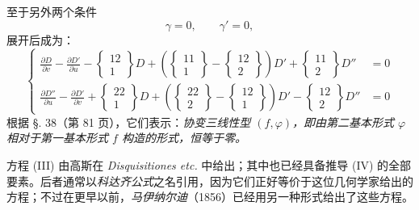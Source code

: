 至于另外两个条件
\[
 \gamma=0,\qquad \gamma'=0,
\]
展开后成为：
\begin{equation}\tag{IV}
\left\{
\begin{aligned}
\frac{\partial D}{\partial v}-\frac{\partial D'}{\partial u}
-\left\{\begin{matrix}12\\1\end{matrix}\right\}D
+\left(
\left\{\begin{matrix}11\\1\end{matrix}\right\}
-\left\{\begin{matrix}12\\2\end{matrix}\right\}
\right)D'
+\left\{\begin{matrix}11\\2\end{matrix}\right\}D''&=0\\
\frac{\partial D''}{\partial u}-\frac{\partial D'}{\partial v}
+\left\{\begin{matrix}22\\1\end{matrix}\right\}D
+\left(
\left\{\begin{matrix}22\\2\end{matrix}\right\}
-\left\{\begin{matrix}12\\1\end{matrix}\right\}
\right)D'
-\left\{\begin{matrix}12\\2\end{matrix}\right\}D''&=0
\end{aligned}
\right.
\end{equation}
根据 \S. 38（第 81 页），它们表示：\emph{协变三线性型 \((f,\varphi)\)，即由第二基本形式 \(\varphi\) 相对于第一基本形式 \(f\) 构造的形式，恒等于零。}

方程 (III) 由高斯在 \emph{Disquisitiones etc.} 中给出；其中也已经具备推导 (IV) 的全部要素。后者通常以\emph{科达齐公式}之名引用，因为它们正好等价于这位几何学家给出的方程；不过在更早以前，\emph{马伊纳尔迪}（1856）已经用另一种形式给出了这些方程。

